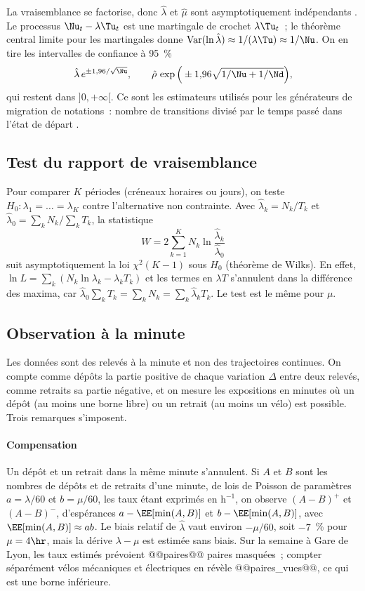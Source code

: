 La vraisemblance se factorise, donc $\hat\lambda$ et $\hat\mu$ sont asymptotiquement indépendants \cite{Alb62,Bil61}. Le processus $\Nu_t-\lambda\Tu_t$ est une martingale de crochet $\lambda\Tu_t$~; le théorème central limite pour les martingales donne $\mathrm{Var}(\ln\hat\lambda)\approx1/(\lambda\Tu)\approx1/\Nu$. On en tire les intervalles de confiance à 95~\%
\[
\hat\lambda\,e^{\pm1{,}96/\sqrt{\Nu}},\qquad\hat\rho\,\exp\Big(\pm1{,}96\sqrt{1/\Nu+1/\Nd}\Big),
\]
qui restent dans $]0,+\infty[$. Ce sont les estimateurs utilisés pour les générateurs de migration de notations~: nombre de transitions divisé par le temps passé dans l'état de départ \cite{LS02}.

\subsection{Test du rapport de vraisemblance}\label{sec:rv}

Pour comparer $K$ périodes (créneaux horaires ou jours), on teste $H_0:\lambda_1=\dots=\lambda_K$ contre l'alternative non contrainte. Avec $\hat\lambda_k=N_k/T_k$ et $\hat\lambda_0=\sum_kN_k/\sum_kT_k$, la statistique
\[
W=2\sum_{k=1}^KN_k\ln\frac{\hat\lambda_k}{\hat\lambda_0}
\]
suit asymptotiquement la loi $\chi^2(K-1)$ sous $H_0$ (théorème de Wilks). En effet, $\ln L=\sum_k(N_k\ln\lambda_k-\lambda_kT_k)$ et les termes en $\lambda T$ s'annulent dans la différence des maxima, car $\hat\lambda_0\sum_kT_k=\sum_kN_k=\sum_k\hat\lambda_kT_k$. Le test est le même pour $\mu$.

\subsection{Observation à la minute}\label{sec:minute}

Les données sont des relevés à la minute et non des trajectoires continues. On compte comme dépôts la partie positive de chaque variation $\Delta$ entre deux relevés, comme retraits sa partie négative, et on mesure les expositions en minutes où un dépôt (au moins une borne libre) ou un retrait (au moins un vélo) est possible. Trois remarques s'imposent.

\paragraph{Compensation} Un dépôt et un retrait dans la même minute s'annulent. Si $A$ et $B$ sont les nombres de dépôts et de retraits d'une minute, de lois de Poisson de paramètres $a=\lambda/60$ et $b=\mu/60$, les taux étant exprimés en $\mathrm{h}^{-1}$, on observe $(A-B)^+$ et $(A-B)^-$, d'espérances $a-\EE[\min(A,B)]$ et $b-\EE[\min(A,B)]$, avec $\EE[\min(A,B)]\approx ab$. Le biais relatif de $\hat\lambda$ vaut environ $-\mu/60$, soit $-7$~\% pour $\mu=4\hr$, mais la dérive $\lambda-\mu$ est estimée sans biais. Sur la semaine à Gare de Lyon, les taux estimés prévoient @@paires@@ paires masquées~; compter séparément vélos mécaniques et électriques en révèle @@paires_vues@@, ce qui est une borne inférieure.

